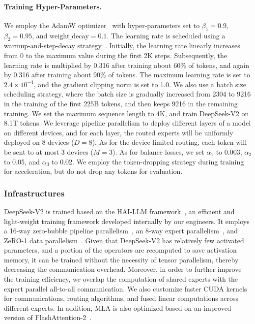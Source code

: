 \paragraph{Training Hyper-Parameters.} We employ the AdamW optimizer~\citep{adamw} with hyper-parameters set to $\beta_1=0.9$, $\beta_2=0.95$, and $\mathrm{weight\_decay}=0.1$. 
The learning rate is scheduled using a warmup-and-step-decay strategy~\citep{deepseek1}. Initially, the learning rate linearly increases from 0 to the maximum value during the first 2K steps. Subsequently, the learning rate is multiplied by 0.316 after training about 60\% of tokens, and again by 0.316 after training about 90\% of tokens. The maximum learning rate is set to $2.4 \times 10^{-4}$, and the gradient clipping norm is set to 1.0. We also use a batch size scheduling strategy, where the batch size is gradually increased from 2304 to 9216 in the training of the first 225B tokens, and then keeps 9216 in the remaining training. We set the maximum sequence length to 4K, and train DeepSeek-V2 on 8.1T tokens. We leverage pipeline parallelism to deploy different layers of a model on different devices, and for each layer, the routed experts will be uniformly deployed on 8 devices ($D=8$). As for the device-limited routing, each token will be sent to at most 3 devices ($M=3$). As for balance losses, we set $\alpha_{1}$ to 0.003, $\alpha_{2}$ to 0.05, and $\alpha_{3}$ to 0.02. We employ the token-dropping strategy during training for acceleration, but do not drop any tokens for evaluation. 

\subsubsection{Infrastructures}

DeepSeek-V2 is trained based on the HAI-LLM framework~\citep{haillm}, an efficient and light-weight training framework developed internally by our engineers. It employs a 16-way zero-bubble pipeline parallelism~\citep{qi2023zero}, an 8-way expert parallelism~\citep{gshard}, and ZeRO-1 data parallelism~\citep{zero}. Given that DeepSeek-V2 has relatively few activated parameters, and a portion of the operators are recomputed to save activation memory, it can be trained without the necessity of tensor parallelism, thereby decreasing the communication overhead. Moreover, in order to further improve the training efficiency, we overlap the computation of shared experts with the expert parallel all-to-all communication. We also customize faster CUDA kernels for communications, routing algorithms, and fused linear computations across different experts. In addition, MLA is also optimized based on an improved version of FlashAttention-2~\citep{dao2023flashattention2}.

